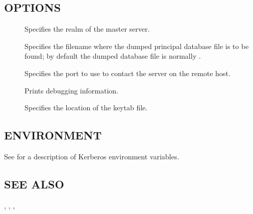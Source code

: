 \documentclass[letterpaper,10pt,english]{sphinxmanual}
\begin{document}
\subsection{OPTIONS}
\label{\detokenize{admin/admin_commands/kprop:options}}\begin{description}
\item[{ }] \leavevmode
Specifies the realm of the master server.

\item[{ }] \leavevmode
Specifies the filename where the dumped principal database file is
to be found; by default the dumped database file is normally
{\hyperref[\detokenize{mitK5defaults:paths}]{}}.

\item[{ }] \leavevmode
Specifies the port to use to contact the {\hyperref[\detokenize{admin/admin_commands/kpropd:kpropd-8}]{}} server
on the remote host.

\item[{}] \leavevmode
Prints debugging information.

\item[{ }] \leavevmode
Specifies the location of the keytab file.

\end{description}


\subsection{ENVIRONMENT}
\label{\detokenize{admin/admin_commands/kprop:environment}}
See  for a description of Kerberos environment
variables.


\subsection{SEE ALSO}
\label{\detokenize{admin/admin_commands/kprop:see-also}}
{\hyperref[\detokenize{admin/admin_commands/kpropd:kpropd-8}]{}}, {\hyperref[\detokenize{admin/admin_commands/kdb5_util:kdb5-util-8}]{}}, {\hyperref[\detokenize{admin/admin_commands/krb5kdc:krb5kdc-8}]{}},
\end{document}
